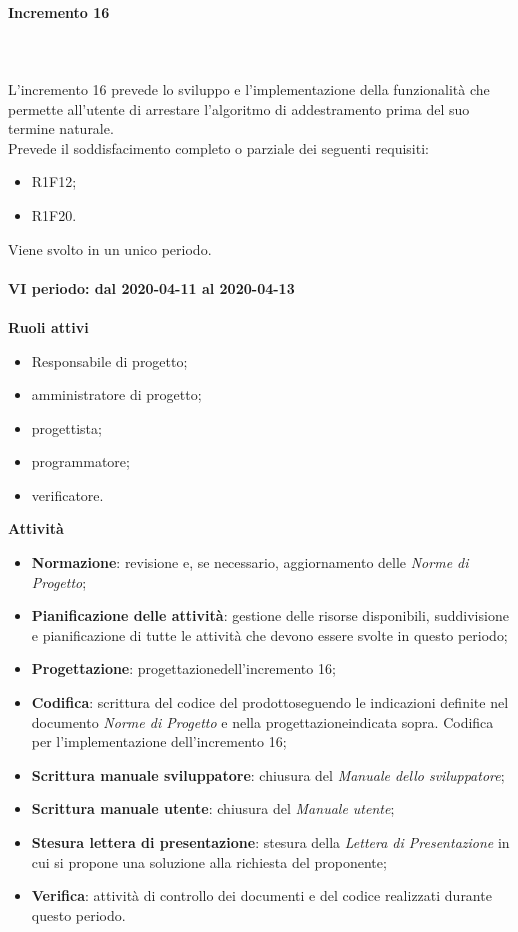 \paragraph{Incremento 16} \mbox{} \\ \\
L'incremento 16 prevede lo sviluppo e l'implementazione della funzionalità che permette all'utente di arrestare l'algoritmo di addestramento prima del suo termine naturale.
\\Prevede il soddisfacimento completo o parziale dei seguenti requisiti:
\begin{itemize}
	\item R1F12;
	\item R1F20.
\end{itemize}
Viene svolto in un unico periodo.
\mbox{} \\ \\ \textbf{VI periodo: dal 2020-04-11 al 2020-04-13} \mbox{} \\ \\
\textbf{Ruoli attivi}
\begin{itemize}
	\item Responsabile di progetto\glo;
	\item amministratore di progetto\glo;
	\item progettista;
	\item programmatore;
	\item verificatore.
\end{itemize}
\textbf{Attività} 
\begin{itemize}
	\item \textbf{Normazione}: revisione e, se necessario, aggiornamento delle \textit{Norme di Progetto};
	\item \textbf{Pianificazione delle attività}: gestione delle risorse disponibili, suddivisione e pianificazione di tutte le attività che devono essere svolte in questo periodo;
	\item \textbf{Progettazione}\glo: progettazione\glosp dell'incremento 16;  
	\item \textbf{Codifica}: scrittura del codice del prodotto\glosp seguendo le indicazioni definite nel documento \textit{Norme di Progetto} e nella progettazione\glosp indicata sopra. Codifica per l'implementazione dell'incremento 16;
	\item \textbf{Scrittura manuale sviluppatore}: chiusura del \textit{Manuale dello sviluppatore};
	\item \textbf{Scrittura manuale utente}: chiusura del \textit{Manuale utente};
	\item \textbf{Stesura lettera di presentazione}: stesura della \textit{Lettera di Presentazione} in cui si propone una soluzione alla richiesta del proponente;
	\item \textbf{Verifica}: attività di controllo dei documenti e del codice realizzati durante questo periodo.
\end{itemize}
